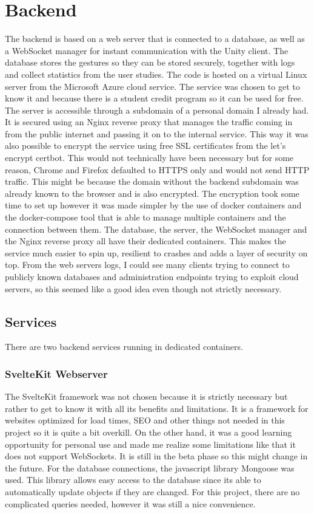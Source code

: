 
\chapter{Backend}
The backend is based on a web server that is connected to a database, as well as a WebSocket manager for instant communication with the Unity client. The database stores the gestures so they can be stored securely, together with logs and collect statistics from the user studies. The code is hosted on a virtual Linux server from the Microsoft Azure cloud service. The service was chosen to get to know it and because there is a student credit program so it can be used for free. The server is accessible through a subdomain of a personal domain I already had. It is secured using an Nginx reverse proxy that manages the traffic coming in from the public internet and passing it on to the internal service. This way it was also possible to encrypt the service using free SSL certificates from the let's encrypt certbot. This would not technically have been necessary but for some reason, Chrome and Firefox defaulted to HTTPS only and would not send HTTP traffic. This might be because the domain without the backend subdomain was already known to the browser and is also encrypted. The encryption took some time to set up however it was made simpler by the use of docker containers and the docker-compose tool that is able to manage multiple containers and the connection between them. The database, the server, the WebSocket manager and the Nginx reverse proxy all have their dedicated containers. This makes the service much easier to spin up, resilient to crashes and adds a layer of security on top. From the web servers logs, I could see many clients trying to connect to publicly known databases and administration endpoints trying to exploit cloud servers, so this seemed like a good idea even though not strictly necessary. 

\section{Services}
There are two backend services running in dedicated containers.

\subsection{SvelteKit Webserver}
The SvelteKit framework was not chosen because it is strictly necessary but rather to get to know it with all its benefits and limitations. It is a framework for websites optimized for load times, SEO and other things not needed in this project so it is quite a bit overkill. On the other hand, it was a good learning opportunity for personal use and made me realize some limitations like that it does not support WebSockets. It is still in the beta phase so this might change in the future. For the database connections, the javascript library Mongoose was used. This library allows easy access to the database since its able to automatically update objects if they are changed. For this project, there are no complicated queries needed, however it was still a nice convenience. 

